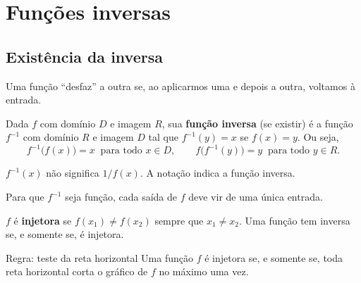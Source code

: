 \section{Funções inversas}

\subsection{Existência da inversa}

Uma função ``desfaz'' a outra se, ao aplicarmos uma e depois a outra, voltamos à entrada.

\begin{definicao}
Dada $f$ com domínio $D$ e imagem $R$, sua \textbf{função inversa} (se existir) é a
função $f^{-1}$ com domínio $R$ e imagem $D$ tal que $f^{-1}(y)=x$ se $f(x)=y$. Ou seja,
\[
f^{-1}\big(f(x)\big)=x\ \text{ para todo } x\in D,\qquad
f\big(f^{-1}(y)\big)=y\ \text{ para todo } y\in R.
\]
\end{definicao}

\begin{nota}
$f^{-1}(x)$ não significa $1/f(x)$. A notação indica a função inversa.
\end{nota}

Para que $f^{-1}$ seja função, cada saída de $f$ deve vir de uma única entrada.

\begin{definicao}
$f$ é \textbf{injetora} se $f(x_1)\neq f(x_2)$ sempre que $x_1\neq x_2$. Uma função tem
inversa se, e somente se, é injetora.
\end{definicao}

\begin{regra}{Regra: teste da reta horizontal}
Uma função $f$ é injetora se, e somente se, toda reta horizontal corta o gráfico de $f$ no
máximo uma vez.
\end{regra}


